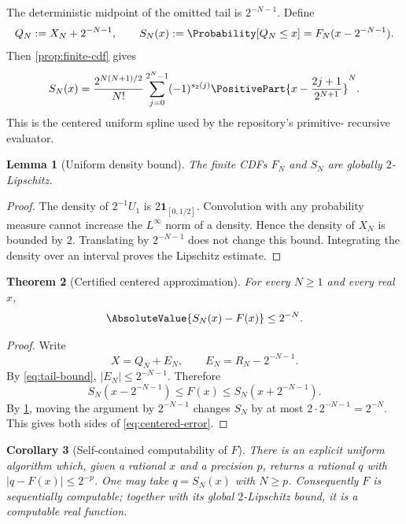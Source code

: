 \documentclass[11pt,oneside]{article}
\newtheorem{theorem}{Theorem}[section]
\newtheorem{lemma}[theorem]{Lemma}
\newtheorem{corollary}[theorem]{Corollary}
\theoremstyle{definition}
\theoremstyle{remark}
\numberwithin{equation}{section}
\begin{document}
The deterministic midpoint of the omitted tail is $2^{-N-1}$.  Define
\begin{equation}\label{eq:centered-truncation}
 Q_N:=X_N+2^{-N-1},
 \qquad
 S_N(x):=\Probability[Q_N\le x]=F_N(x-2^{-N-1}).
\end{equation}
Then \cref{prop:finite-cdf} gives
\begin{equation}\label{eq:centered-spline-formula}
 S_N(x)=
 \frac{2^{N(N+1)/2}}{N!}
 \sum_{j=0}^{2^N-1}(-1)^{s_2(j)}
 \PositivePart{x-\frac{2j+1}{2^{N+1}}}^{N}.
\end{equation}
This is the centered uniform spline used by the repository's primitive-
recursive evaluator.

\begin{lemma}[Uniform density bound]\label{lem:density-bound}
The finite CDFs $F_N$ and $S_N$ are globally $2$-Lipschitz.
\end{lemma}

\begin{proof}
The density of $2^{-1}U_1$ is $2\mathbf1_{[0,1/2]}$.  Convolution with any
probability measure cannot increase the $L^\infty$ norm of a density.  Hence
the density of $X_N$ is bounded by $2$.  Translating by $2^{-N-1}$ does not
change this bound.  Integrating the density over an interval proves the
Lipschitz estimate.
\end{proof}

\begin{theorem}[Certified centered approximation]\label{thm:centered-error}
For every $N\ge1$ and every real $x$,
\begin{equation}\label{eq:centered-error}
 \AbsoluteValue{S_N(x)-F(x)}\le2^{-N}.
\end{equation}
\end{theorem}

\begin{proof}
Write
\[
 X=Q_N+E_N,
 \qquad
 E_N=R_N-2^{-N-1}.
\]
By \eqref{eq:tail-bound}, $|E_N|\le2^{-N-1}$.  Therefore
\[
 S_N(x-2^{-N-1})\le F(x)\le S_N(x+2^{-N-1}).
\]
By \cref{lem:density-bound}, moving the argument by $2^{-N-1}$ changes $S_N$
by at most $2\cdot2^{-N-1}=2^{-N}$.  This gives both sides of
\eqref{eq:centered-error}.
\end{proof}

\begin{corollary}[Self-contained computability of $F$]\label{cor:F-computable}
There is an explicit uniform algorithm which, given a rational $x$ and a
precision $p$, returns a rational $q$ with
$|q-F(x)|\le2^{-p}$.  One may take $q=S_N(x)$ with $N\ge p$.
Consequently $F$ is sequentially computable; together with its global
$2$-Lipschitz bound, it is a computable real function.
\end{corollary}
\end{document}
